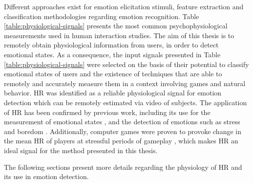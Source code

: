 Different approaches exist for emotion elicitation stimuli, feature extraction and classification methodologies regarding emotion recognition. Table \ref{table:physiological-signals} presents the most common psychophysiological measurements used in human interaction studies. The aim of this thesis is to remotely obtain physiological information from users, in order to detect emotional states. As a consequence, the input signals presented in Table \ref{table:physiological-signals} were selected on the basis of their potential to classify emotional states of users and the existence of techniques that are able to remotely and accurately measure them in a context involving games and natural behavior. HR was identified as a reliable physiological signal for emotion detection which can be remotely estimated via video of subjects. The application of HR has been confirmed by previous work, including its use for the measurement of emotional states \parencite{kivikangas2011review}, and the detection of emotions such as stress \parencite{choi2009using} and boredom \parencite{yamakoshi2007preliminary}. Additionally, computer games were proven to provoke change in the mean HR of players at stressful periods of gameplay \parencite{sharma2006assessment,rodriguez2015vr}, which makes HR an ideal signal for the method presented in this thesis.

The following sections present more details regarding the physiology of HR and its use in emotion detection.




